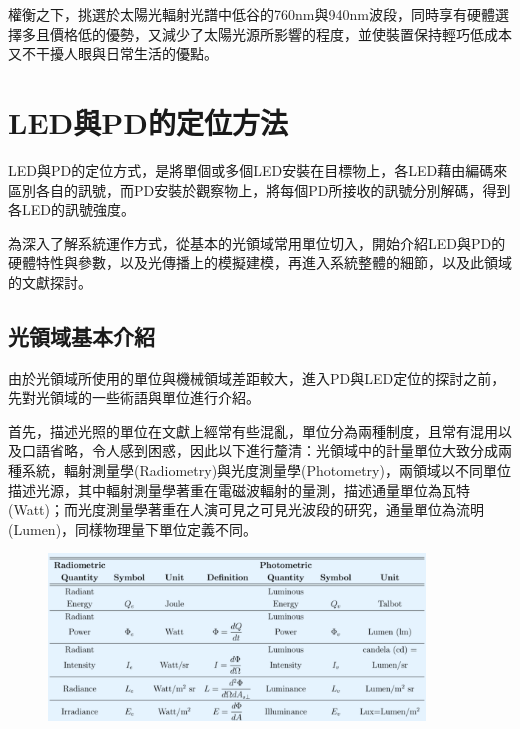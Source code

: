         權衡之下，挑選於太陽光輻射光譜中低谷的760nm與940nm波段，同時享有硬體選擇多且價格低的優勢，又減少了太陽光源所影響的程度，並使裝置保持輕巧低成本又不干擾人眼與日常生活的優點。

\section{LED與PD的定位方法}

    LED與PD的定位方式，是將單個或多個LED安裝在目標物上，各LED藉由編碼來區別各自的訊號，而PD安裝於觀察物上，將每個PD所接收的訊號分別解碼，得到各LED的訊號強度。

    為深入了解系統運作方式，從基本的光領域常用單位切入，開始介紹LED與PD的硬體特性與參數，以及光傳播上的模擬建模，再進入系統整體的細節，以及此領域的文獻探討。

    \subsection{光領域基本介紹}
        
        由於光領域所使用的單位與機械領域差距較大，進入PD與LED定位的探討之前，先對光領域的一些術語與單位進行介紹。

        首先，描述光照的單位在文獻上經常有些混亂，單位分為兩種制度，且常有混用以及口語省略，令人感到困惑，因此以下進行釐清：光領域中的計量單位大致分成兩種系統，輻射測量學(Radiometry)與光度測量學(Photometry)，兩領域以不同單位描述光源，其中輻射測量學著重在電磁波輻射的量測，描述通量單位為瓦特(Watt)；而光度測量學著重在人演可見之可見光波段的研究，通量單位為流明(Lumen)，同樣物理量下單位定義不同。\cite{radiometry_and_photometry}
        


        \begin{figure}[ht]
            \centering
            \includegraphics[width=10cm]{00temppic/photometry_table.png}
        \end{figure}


